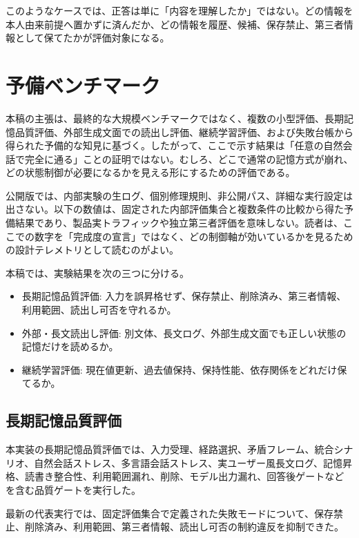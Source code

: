 \documentclass[12pt,a4paper]{article}
\begin{document}
このようなケースでは、正答は単に「内容を理解したか」ではない。どの情報を本人由来前提へ置かずに済んだか、どの情報を履歴、候補、保存禁止、第三者情報として保てたかが評価対象になる。

\section{予備ベンチマーク}\label{ux4e88ux5099ux30d9ux30f3ux30c1ux30deux30fcux30af}

本稿の主張は、最終的な大規模ベンチマークではなく、複数の小型評価、長期記憶品質評価、外部生成文面での読出し評価、継続学習評価、および失敗台帳から得られた予備的な知見に基づく。したがって、ここで示す結果は「任意の自然会話で完全に通る」ことの証明ではない。むしろ、どこで通常の記憶方式が崩れ、どの状態制御が必要になるかを見える形にするための評価である。

公開版では、内部実験の生ログ、個別修理規則、非公開パス、詳細な実行設定は出さない。以下の数値は、固定された内部評価集合と複数条件の比較から得た予備結果であり、製品実トラフィックや独立第三者評価を意味しない。読者は、ここでの数字を「完成度の宣言」ではなく、どの制御軸が効いているかを見るための設計テレメトリとして読むのがよい。

本稿では、実験結果を次の三つに分ける。

\begin{itemize}
\tightlist
\item
  長期記憶品質評価: 入力を誤昇格せず、保存禁止、削除済み、第三者情報、利用範囲、読出し可否を守れるか。
\item
  外部・長文読出し評価: 別文体、長文ログ、外部生成文面でも正しい状態の記憶だけを読めるか。
\item
  継続学習評価: 現在値更新、過去値保持、保持性能、依存関係をどれだけ保てるか。
\end{itemize}

\subsection{長期記憶品質評価}\label{ux9577ux671fux8a18ux61b6ux54c1ux8ceaux8a55ux4fa1}

本実装の長期記憶品質評価では、入力受理、経路選択、矛盾フレーム、統合シナリオ、自然会話ストレス、多言語会話ストレス、実ユーザー風長文ログ、記憶昇格、読書き整合性、利用範囲漏れ、削除、モデル出力漏れ、回答後ゲートなどを含む品質ゲートを実行した。

最新の代表実行では、固定評価集合で定義された失敗モードについて、保存禁止、削除済み、利用範囲、第三者情報、読出し可否の制約違反を抑制できた。
\end{document}
